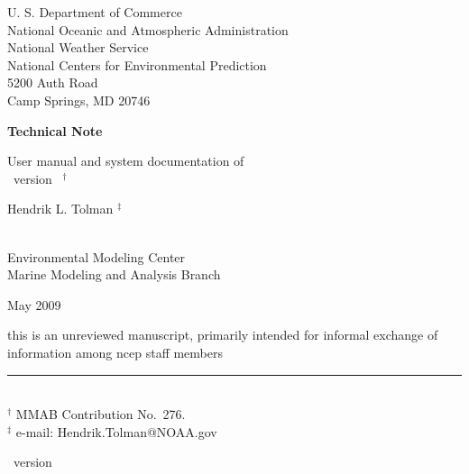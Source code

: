
\pagestyle{empty}

\begin{center} 
U. S. Department of Commerce \\
National Oceanic and Atmospheric Administration \\
National Weather Service \\
National Centers for Environmental Prediction \\
5200 Auth Road \\
Camp Springs, MD 20746


\vspace{15mm}

{\bf Technical Note}

\vspace{15mm}

{\large User manual and system documentation of \\
\ww\ version \WWver\ $^\dag$} \\

\vspace{15mm}

Hendrik L. Tolman $^\ddag$\\
\strut \\
Environmental Modeling Center \\
Marine Modeling and Analysis Branch

\vfill

May 2009


\vfill
{\sc this is an unreviewed manuscript, primarily intended for informal
exchange of information among ncep staff members}

\end{center}
\noindent \rule{140mm}{0.5mm} \\
{\small $^\dag$ MMAB Contribution No.~276. \\
$^\ddag$ e-mail: Hendrik.Tolman@NOAA.gov}

\bpage

\pb

         {\hspace{36mm} \ww\ version \WWver}
\pagestyle{myheadings}
\setcounter{page}{1}
\tableofcontents



\pb
\pagestyle{myheadings}

